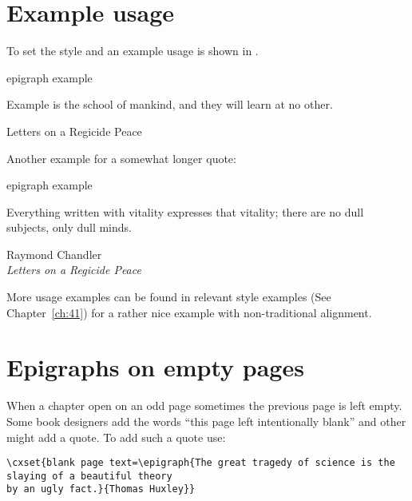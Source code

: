 \section{Example usage}
To set the style and an example usage is shown in .

\begin{example}{epigraph example}{}

\epigraph{Example is the school of mankind, and they
will learn at no other.}{Letters on a Regicide Peace}
\end{example}

Another example for a somewhat longer quote:

\begin{example}{epigraph example}{}
\epigraph{Everything written with vitality expresses that vitality; there are no dull subjects, 
only dull minds.}{Raymond Chandler\\\textit{Letters on a Regicide Peace}}
\end{example}

More usage examples can be found in relevant style examples (See Chapter~\ref{ch:41}) for a rather 
nice example with non-traditional alignment.

\section{Epigraphs on empty pages}

When a chapter open on an odd page sometimes the  previous page is left empty. Some book designers 
add the words ``this page left intentionally blank'' and other might add a quote. To add such a quote use:

\begin{tcolorbox}
\begin{lstlisting}
\cxset{blank page text=\epigraph{The great tragedy of science is the slaying of a beautiful theory
by an ugly fact.}{Thomas Huxley}}
\end{lstlisting}
\end{tcolorbox}
